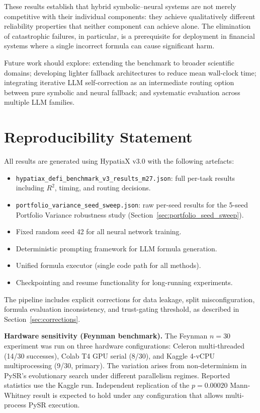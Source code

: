 \documentclass[twoside,11pt]{article}
\newcommand{\Rsq}{R^{2}}
\begin{document}
These results establish that hybrid symbolic--neural systems are not merely
competitive with their individual components: they achieve qualitatively different
reliability properties that neither component can achieve alone.  The elimination
of catastrophic failures, in particular, is a prerequisite for deployment in
financial systems where a single incorrect formula can cause significant harm.

Future work should explore: extending the benchmark to broader scientific domains;
developing lighter fallback architectures to reduce mean wall-clock time;
integrating iterative LLM self-correction as an intermediate routing option between
pure symbolic and neural fallback; and systematic evaluation across multiple LLM
families.

\section*{Reproducibility Statement}

All results are generated using HypatiaX v3.0 with the following artefacts:
\begin{itemize}
  \item \texttt{hypatiax\_defi\_benchmark\_v3\_results\_m27.json}: full per-task
    results including $\Rsq$, timing, and routing decisions.
  \item \texttt{portfolio\_variance\_seed\_sweep.json}: raw per-seed results for
    the 5-seed Portfolio Variance robustness study (Section~\ref{sec:portfolio_seed_sweep}).
  \item Fixed random seed 42 for all neural network training.
  \item Deterministic prompting framework for LLM formula generation.
  \item Unified formula executor (single code path for all methods).
  \item Checkpointing and resume functionality for long-running experiments.
\end{itemize}
The pipeline includes explicit corrections for data leakage, split misconfiguration,
formula evaluation inconsistency, and trust-gating threshold, as described in
Section~\ref{sec:corrections}.

\textbf{Hardware sensitivity (Feynman benchmark).}  The Feynman $n=30$ experiment was
run on three hardware configurations: Celeron multi-threaded (14/30 successes),
Colab T4 GPU serial (8/30), and Kaggle 4-vCPU multiprocessing (9/30, primary).
The variation arises from non-determinism in PySR's evolutionary search under
different parallelism regimes.  Reported statistics use the Kaggle run.
Independent replication of the $p=0.00020$ Mann-Whitney result is expected to hold
under any configuration that allows multi-process PySR execution.
\end{document}
